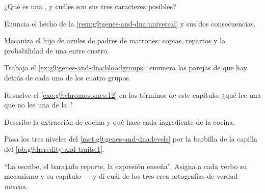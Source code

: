\begin{exercise}[$\star$]\label{exo:g9:genes-and-dna:5}
¿Qué es una , y cuáles son sus tres caracteres posibles?
\end{exercise}

\begin{exercise}[$\star$]\label{exo:g9:genes-and-dna:6}
Enuncia el hecho de la \cref{rem:g9:genes-and-dna:universal} y sus dos
consecuencias.
\end{exercise}

\begin{exercise}[$\star\star$]\label{exo:g9:genes-and-dna:7}
Mecaniza el hijo de  azules de padres de  marrones: copias,
repartos y la probabilidad de una entre cuatro.
\end{exercise}

\begin{exercise}[$\star\star$]\label{exo:g9:genes-and-dna:8}
Trabaja el \cref{ex:g9:genes-and-dna:bloodgroups}: enumera las parejas
de  que hay detrás de cada uno de los cuatro grupos.
\end{exercise}

\begin{exercise}[$\star\star$]\label{exo:g9:genes-and-dna:9}
Resuelve el \cref{exo:g9:chromosomes:12} en los términos de este
capítulo: ¿qué lee una  que no lee una  de la ?
\end{exercise}

\begin{exercise}[$\star\star$]\label{exo:g9:genes-and-dna:10}
Describe la extracción de cocina y qué hace cada ingrediente de la
cocina.
\end{exercise}

\begin{exercise}[$\star\star$]\label{exo:g9:genes-and-dna:11}
Pasa los tres niveles del \cref{met:g9:genes-and-dna:levels} por la
barbilla de la capilla del \cref{pb:g9:heredity-and-traits:1}.
\end{exercise}

\begin{exercise}[$\star\star\star$]\label{exo:g9:genes-and-dna:12}
``La  escribe, el barajado reparte, la expresión enseña''.
Asigna a cada verbo su mecanismo y su capítulo --- y di cuál de los
tres crea ortografías de verdad \emph{nuevas}.
\end{exercise}

